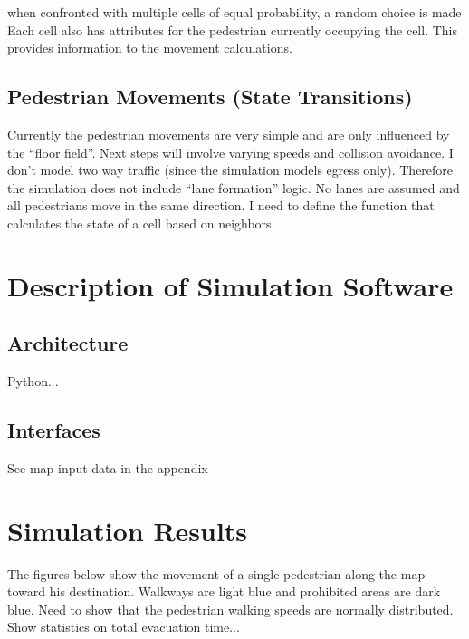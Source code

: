 \documentclass[paper=a4, fontsize=11pt]{scrartcl}
\numberwithin{equation}{section}		%
\numberwithin{figure}{section}			%
\numberwithin{table}{section}		    %
\begin{document}
	when confronted with multiple cells of equal probability, a random choice is made
	\\
	
	\noindent
	Each cell also has attributes for the pedestrian currently occupying the cell. This provides 
	information to the movement calculations.
	
	\subsection{Pedestrian Movements (State Transitions)}
	Currently the pedestrian movements are very simple and are only influenced by the ``floor 
	field''. Next steps will involve varying speeds and collision avoidance. I don't model two way 
	traffic (since the simulation models egress only). Therefore the simulation does not include 
	``lane formation'' logic. No lanes are assumed and all pedestrians move in the same direction. 
	I need to define the function that calculates the state of a cell based on neighbors.
	
	
	
	\section{Description of Simulation Software}
	
	\subsection{Architecture}
	Python...
	
    \subsection{Interfaces}
    See map input data in the appendix
	
	\section{Simulation Results}
	The figures below show the movement of a single pedestrian along the map toward his 
	destination. Walkways are light blue and prohibited areas are dark blue. Need to show that the 
	pedestrian walking speeds are normally distributed. Show statistics on total evacuation time...
	
\end{document}
